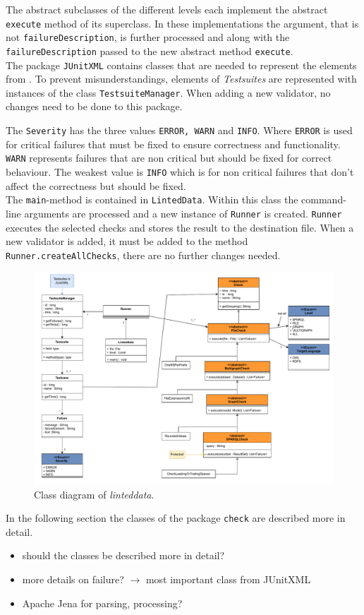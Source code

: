 \documentclass[11pt,a4paper]{article}
\newcommand{\function}[1]{\texttt{#1}}
\newcommand{\argument}[1]{\texttt{#1}}
\newcommand{\class}[1]{\texttt{#1}}
\newcommand{\enum}[1]{\texttt{#1}}
\newcommand{\package}[1]{\texttt{#1}}
\newcommand{\toolname}{\textit{linteddata}}
\begin{document}
The abstract subclasses of the different levels each implement the abstract \texttt{execute} method of its superclass. 
In these implementations the argument, that is not \argument{failureDescription}, is further processed and along with the \argument{failureDescription} passed to the new abstract method \function{execute}.
\\
The package \package{JUnitXML} contains classes that are needed to represent the elements from \cite{JUnitXML_ibm}. 
To prevent misunderstandings, elements of \textit{Testsuites} are represented with instances of the class \class{TestsuiteManager}. 
When adding a new validator, no changes need to be done to this package. 

The \enum{Severity} has the three values \enum{ERROR, WARN} and \enum{INFO}. 
Where \enum{ERROR} is used for critical failures that must be fixed to ensure correctness and functionality. 
\enum{WARN} represents failures that are non critical but should be fixed for correct behaviour. 
The weakest value is \enum{INFO} which is for non critical failures that don't affect the correctness but should be fixed.   
\\
The \function{main}-method is contained in \class{LintedData}. 
Within this class the command-line arguments are processed and a new instance of \class{Runner} is created. 
\class{Runner} executes the selected checks and stores the result to the destination file. 
When a new validator is added, it must be added to the method \function{Runner.createAllChecks}, there are no further changes needed. 
%
\begin{landscape}
\begin{figure}[tb]
	\centering
	\includegraphics[width=\textwidth]{../graphics/class_diagram.pdf}
	\caption{Class diagram of \toolname .}
	\label{fig:general_architecture:class_diagram}
\end{figure}
\end{landscape}
%
In the following section the classes of the package \package{check} are described more in detail. 
\begin{itemize}
	\item should the classes be described more in detail?
	\item more details on failure? $\rightarrow$ most important class from JUnitXML
	\item Apache Jena for parsing, processing?	
\end{itemize}
%
\end{document}
